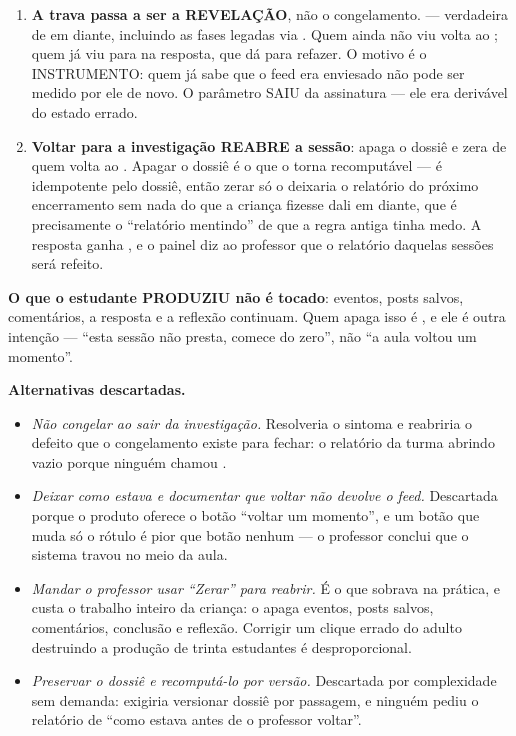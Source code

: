 \begin{enumerate}
  \item \textbf{A trava passa a ser a REVELAÇÃO}, não o congelamento.
     --- verdadeira de  em diante,
    incluindo as fases legadas via . Quem ainda não viu volta
    ao ; quem já viu para na resposta, que dá para refazer. O motivo é
    o INSTRUMENTO: quem já sabe que o feed era enviesado não pode ser medido por
    ele de novo. O parâmetro  SAIU da assinatura --- ele era
    derivável do estado errado.
  \item \textbf{Voltar para a investigação REABRE a sessão}: 
    apaga o dossiê e zera  de quem volta ao . Apagar o
    dossiê é o que o torna recomputável ---  é idempotente pelo
    dossiê, então zerar só o  deixaria o relatório do próximo
    encerramento sem nada do que a criança fizesse dali em diante, que é
    precisamente o \enquote{relatório mentindo} de que a regra antiga tinha
    medo. A resposta ganha , e o painel diz ao professor que o
    relatório daquelas sessões será refeito.
\end{enumerate}

\textbf{O que o estudante PRODUZIU não é tocado}: eventos, posts salvos,
comentários, a resposta e a reflexão continuam. Quem apaga isso é
, e ele é outra intenção --- \enquote{esta sessão não
presta, comece do zero}, não \enquote{a aula voltou um momento}.

\textbf{Alternativas descartadas.}
\begin{itemize}
  \item \emph{Não congelar ao sair da investigação.} Resolveria o sintoma e
    reabriria o defeito que o congelamento existe para fechar: o relatório da
    turma abrindo vazio porque ninguém chamou .
  \item \emph{Deixar como estava e documentar que voltar não devolve o feed.}
    Descartada porque o produto oferece o botão \enquote{voltar um momento}, e
    um botão que muda só o rótulo é pior que botão nenhum --- o professor
    conclui que o sistema travou no meio da aula.
  \item \emph{Mandar o professor usar \enquote{Zerar} para reabrir.} É o que
    sobrava na prática, e custa o trabalho inteiro da criança: o 
    apaga eventos, posts salvos, comentários, conclusão e reflexão. Corrigir um
    clique errado do adulto destruindo a produção de trinta estudantes é
    desproporcional.
  \item \emph{Preservar o dossiê e recomputá-lo por versão.} Descartada por
    complexidade sem demanda: exigiria versionar dossiê por passagem, e ninguém
    pediu o relatório de \enquote{como estava antes de o professor voltar}.
\end{itemize}

